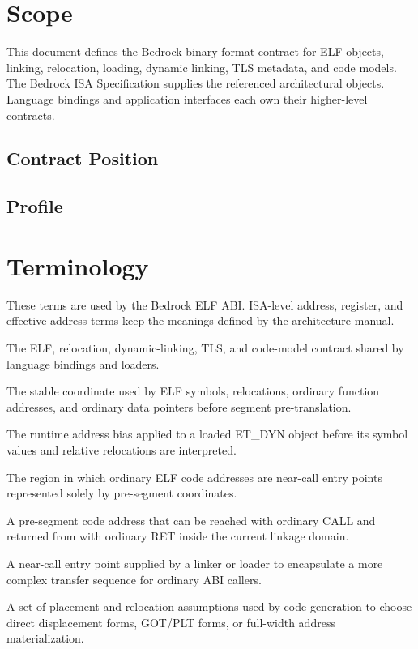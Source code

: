 \documentclass[10pt,twoside]{article}
\begin{document}
\BedrockDocumentHasFiguresfalse
\BedrockFrontMatter

\clearpage
\section{Scope}\label{page:scope}
This document defines the Bedrock binary-format contract for ELF objects,
linking, relocation, loading, dynamic linking, TLS metadata, and code models.
The Bedrock ISA Specification supplies the referenced architectural objects.
Language bindings and application interfaces each own their higher-level
contracts.

\subsection{Contract Position}

\subsection{Profile}

\clearpage
\section{Terminology}\label{page:terminology}
These terms are used by the Bedrock ELF ABI. ISA-level address, register, and effective-address terms keep the meanings defined by the architecture manual.
\begin{description}[style=nextline,leftmargin=1.45in,labelwidth=1.35in,itemsep=3pt,topsep=3pt]
\item[ELF ABI] The ELF, relocation, dynamic-linking, TLS, and code-model contract shared by language bindings and loaders.
\item[pre-segment virtual address] The stable coordinate used by ELF symbols, relocations, ordinary function addresses, and ordinary data pointers before segment pre-translation.
\item[load base] The runtime address bias applied to a loaded ET\_DYN object before its symbol values and relative relocations are interpreted.
\item[ABI-visible linkage domain] The region in which ordinary ELF code addresses are near-call entry points represented solely by pre-segment coordinates.
\item[near-call entry address] A pre-segment code address that can be reached with ordinary CALL and returned from with ordinary RET inside the current linkage domain.
\item[veneer] A near-call entry point supplied by a linker or loader to encapsulate a more complex transfer sequence for ordinary ABI callers.
\item[code model] A set of placement and relocation assumptions used by code generation to choose direct displacement forms, GOT/PLT forms, or full-width address materialization.
\end{description}
\end{document}
